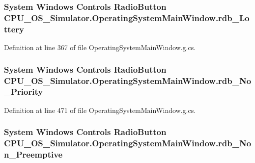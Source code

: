 \subsubsection[{rdb\+\_\+\+Lottery}]{\setlength{\rightskip}{0pt plus 5cm}System Windows Controls Radio\+Button C\+P\+U\+\_\+\+O\+S\+\_\+\+Simulator.\+Operating\+System\+Main\+Window.\+rdb\+\_\+\+Lottery\hspace{0.3cm}{\ttfamily [package]}}\label{class_c_p_u___o_s___simulator_1_1_operating_system_main_window_ad9756edfc9b0ce93336c779551675ba3}


Definition at line 367 of file Operating\+System\+Main\+Window.\+g.\+cs.

\hypertarget{class_c_p_u___o_s___simulator_1_1_operating_system_main_window_acc931be7e054344ea9d99b84ef5c2519}{}
\subsubsection[{rdb\+\_\+\+No\+\_\+\+Priority}]{\setlength{\rightskip}{0pt plus 5cm}System Windows Controls Radio\+Button C\+P\+U\+\_\+\+O\+S\+\_\+\+Simulator.\+Operating\+System\+Main\+Window.\+rdb\+\_\+\+No\+\_\+\+Priority\hspace{0.3cm}{\ttfamily [package]}}\label{class_c_p_u___o_s___simulator_1_1_operating_system_main_window_acc931be7e054344ea9d99b84ef5c2519}


Definition at line 471 of file Operating\+System\+Main\+Window.\+g.\+cs.

\hypertarget{class_c_p_u___o_s___simulator_1_1_operating_system_main_window_a3021441de903045cba2ff708184e0ac5}{}
\subsubsection[{rdb\+\_\+\+Non\+\_\+\+Preemptive}]{\setlength{\rightskip}{0pt plus 5cm}System Windows Controls Radio\+Button C\+P\+U\+\_\+\+O\+S\+\_\+\+Simulator.\+Operating\+System\+Main\+Window.\+rdb\+\_\+\+Non\+\_\+\+Preemptive\hspace{0.3cm}{\ttfamily [package]}}\label{class_c_p_u___o_s___simulator_1_1_operating_system_main_window_a3021441de903045cba2ff708184e0ac5}


